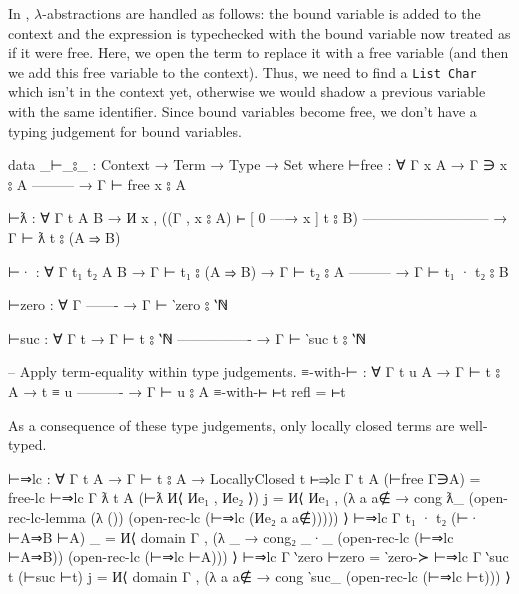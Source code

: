 In \citet[chapter~Lambda]{wadler_programming_2022}, $\lambda$-abstractions are handled as follows:
the bound variable is added to the context and the expression is typechecked with the bound variable
now treated as if it were free. Here, we open the term to replace it with a free variable (and then
we add this free variable to the context). Thus, we need to find a \texttt{List Char} which isn't in
the context yet, otherwise we would shadow a previous variable with the same identifier. Since bound
variables become free, we don't have a typing judgement for bound variables.
\begin{code}
  data _⊢_⦂_ : Context → Term → Type → Set where
    ⊢free : ∀ {Γ x A}
      → Γ ∋ x ⦂ A
        ---------
      → Γ ⊢ free x ⦂ A

    ⊢ƛ : ∀ {Γ t A B}
      → И x , ((Γ , x ⦂ A) ⊢ [ 0 —→ x ] t ⦂ B)
        ---------------------------
      → Γ ⊢ ƛ t ⦂ (A ⇒ B)

    ⊢· : ∀ {Γ t₁ t₂ A B}
      → Γ ⊢ t₁ ⦂ (A ⇒ B)
      → Γ ⊢ t₂ ⦂ A
        ---------
      → Γ ⊢ t₁ · t₂ ⦂ B

    ⊢zero : ∀ {Γ}
        -------
      → Γ ⊢ ‵zero ⦂ ‵ℕ

    ⊢suc : ∀ {Γ t}
      → Γ ⊢ t ⦂ ‵ℕ
        ----------------
      → Γ ⊢ ‵suc t ⦂ ‵ℕ

  -- Apply term-equality within type judgements.
  ≡-with-⊢ : ∀ {Γ t u A}
    → Γ ⊢ t ⦂ A
    → t ≡ u
      ----------
    → Γ ⊢ u ⦂ A
  ≡-with-⊢ ⊢t refl = ⊢t
\end{code}

As a consequence of these type judgements, only locally closed terms are well-typed.
\begin{code}
  ⊢⇒lc : ∀ {Γ t A} → Γ ⊢ t ⦂ A → LocallyClosed t
  ⊢⇒lc {Γ} {t} {A} (⊢free Γ∋A) = free-lc
  ⊢⇒lc {Γ} {ƛ t} {A} (⊢ƛ И⟨ Иe₁ ,  Иe₂ ⟩) j =
    И⟨ Иe₁ , (λ a {a∉} → cong ƛ_
      (open-rec-lc-lemma
        (λ ())
        (open-rec-lc (⊢⇒lc (Иe₂ a {a∉}))))) ⟩
  ⊢⇒lc {Γ} {t₁ · t₂} (⊢· ⊢A⇒B ⊢A) _ =
    И⟨ domain Γ , (λ _ → cong₂ _·_
      (open-rec-lc (⊢⇒lc ⊢A⇒B)) (open-rec-lc (⊢⇒lc ⊢A))) ⟩
  ⊢⇒lc {Γ} {‵zero} ⊢zero = ‵zero-≻
  ⊢⇒lc {Γ} {‵suc t} (⊢suc ⊢t) j =
    И⟨ domain Γ , (λ a {a∉} →
      cong ‵suc_ (open-rec-lc (⊢⇒lc ⊢t))) ⟩
\end{code}

